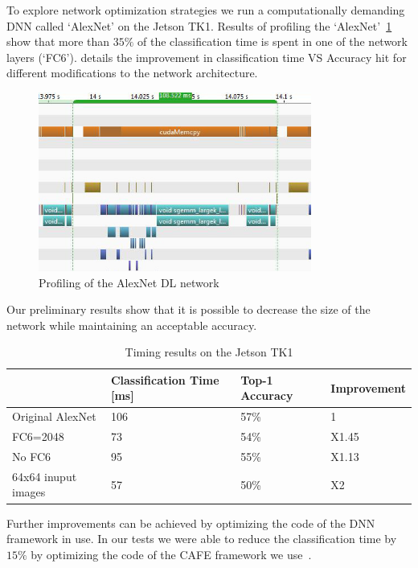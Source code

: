 \documentclass{article} %
\begin{document}
To explore network optimization strategies we run a computationally demanding
DNN called `AlexNet' on the Jetson TK1. Results of profiling the
`AlexNet'~\cref{fig:alex_time} show that more than $35\%$ of the classification
time is spent in one of the network layers (`FC6').  details
the improvement in classification time VS Accuracy hit for different
modifications to the network architecture.
\begin{figure}[h]
	\centering
	\includegraphics[width=0.8\textwidth]{alexnet_time_line_small}
	\caption{Profiling of the AlexNet DL network}
	\label{fig:alex_time}
\end{figure}
Our preliminary results show that it is possible to decrease the size of the
network  while maintaining an acceptable accuracy.
\begin{table}
	\centering
	\begin{tabular}{ | l | l | l | l | }
		\hline
		                    & Classification Time [ms] & Top-1 Accuracy & Improvement \\ \hline
		Original AlexNet    & 106                      & 57\%           & 1           \\ \hline
		FC6=2048            & 73                       & 54\%           & X1.45       \\ \hline
		No FC6              & 95                       & 55\%           & X1.13       \\ \hline
		64x64 inuput images & 57                       & 50\%           & X2          \\ \hline
	\end{tabular}
	\caption{Timing results on the Jetson TK1}
	\label{tb:alexnet}
\end{table}

Further improvements can be achieved by optimizing the code of the DNN framework
in use. In our tests we were able to reduce the classification time by $15\%$ by
optimizing the code of the CAFE framework we use~\cite{jia2014caffe}.
\end{document}
